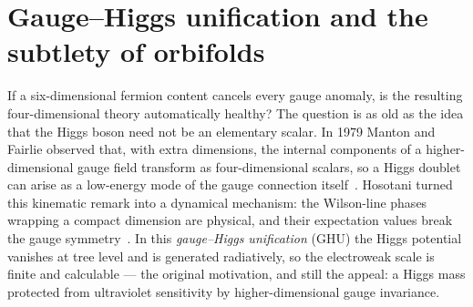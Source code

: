 \documentclass[11pt,a4paper]{article}
\begin{document}
\section{Gauge--Higgs unification and the subtlety of orbifolds}\label{sec:intro}
If a six-dimensional fermion content cancels every gauge anomaly, is the resulting
four-dimensional theory automatically healthy? The question is as old as the idea that
the Higgs boson need not be an elementary scalar. In 1979 Manton and Fairlie observed
that, with extra dimensions, the internal components of a higher-dimensional gauge
field transform as four-dimensional scalars, so a Higgs doublet can arise as a
low-energy mode of the gauge connection itself~\cite{Manton,Fairlie}. Hosotani turned
this kinematic remark into a dynamical mechanism: the Wilson-line phases wrapping a
compact dimension are physical, and their expectation values break the gauge
symmetry~\cite{Hosotani}. In this \emph{gauge--Higgs unification} (GHU) the Higgs
potential vanishes at tree level and is generated radiatively, so the electroweak scale
is finite and calculable --- the original motivation, and still the appeal: a Higgs
mass protected from ultraviolet sensitivity by higher-dimensional gauge invariance.
\end{document}
